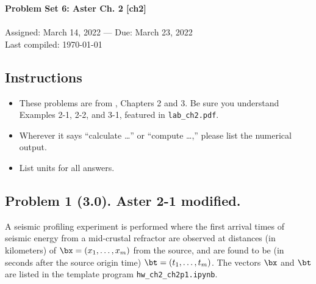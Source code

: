 \documentclass[11pt,titlepage,fleqn]{article}
\newcommand{\tfile}{{\tt hw\_ch2\_ch2p1.ipynb}}
\begin{document}

\begin{spacing}{1.2}
\centering
{\large \bf Problem Set 6: Aster Ch. 2 [ch2]} \\
\cltag\ \\
Assigned: March 14, 2022 --- Due: March 23, 2022 \\
Last compiled: \today
\end{spacing}


\subsection*{Instructions}

\begin{itemize}
\item These problems are from \citet{Aster}, Chapters 2 and 3. Be sure you understand Examples 2-1, 2-2, and 3-1, featured in \verb+lab_ch2.pdf+.
\item Wherever it says ``calculate \ldots'' or ``compute \ldots,'' please list the numerical output.
\item List units for all answers.
\end{itemize}

\subsection*{Problem 1 (3.0). Aster 2-1 modified.}

A seismic profiling experiment is performed where the first arrival times of seismic energy from a mid-crustal refractor are observed at distances (in kilometers) of $\bx = (x_1, \ldots, x_m)$ from the source, and are found to be (in seconds after the source origin time) $\bt = (t_1, \ldots, t_m)$. The vectors $\bx$ and $\bt$ are listed in the template program \tfile.
\end{document}
